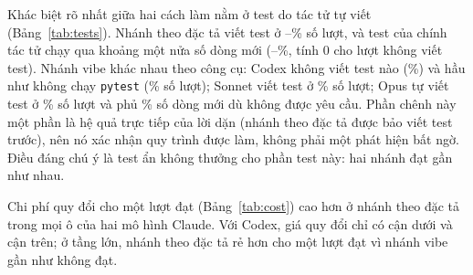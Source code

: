 \begin{table}[H]
\centering\scriptsize\setlength{\tabcolsep}{3pt}
\caption{Chi phí và chất lượng: mỗi ô là trung bình của nhánh theo đặc tả / nhánh vibe. Token gồm cả
token đọc cache. Lỗi tĩnh là số lỗi ruff và pyrefly trên các file bị đổi. Hồi quy là tỉ lệ lượt làm hỏng
ít nhất một test cũ. $\Delta$MI là thay đổi chỉ số bảo trì so với commit cha; H3c đọc ``không kém hơn'' với
biên 5 điểm.}
\label{tab:secondary}

\end{table}

Khác biệt rõ nhất giữa hai cách làm nằm ở test do tác tử tự viết (Bảng~\ref{tab:tests}). Nhánh theo đặc tả
viết test ở \NumResSonnetSpecTestsAnyPct{}--\NumResCodexSpecTestsAnyPct{}\% số lượt, và test của chính tác
tử chạy qua khoảng một nửa số dòng mới (\NumResSonnetSpecCovPct{}--\NumResOpusSpecCovPct{}\%, tính 0 cho
lượt không viết test). Nhánh vibe khác nhau theo công cụ: Codex không viết test nào
(\NumResCodexVibeTestsAnyPct{}\%) và hầu như không chạy \texttt{pytest} (\NumResCodexVibePytestPct{}\% số
lượt); Sonnet viết test ở \NumResSonnetVibeTestsAnyPct{}\% số lượt; Opus tự viết test ở
\NumResOpusVibeTestsAnyPct{}\% số lượt và phủ \NumResOpusVibeCovPct{}\% số dòng mới dù không được yêu cầu.
Phần chênh này một phần là hệ quả trực tiếp của lời dặn (nhánh theo đặc tả được bảo viết test trước), nên
nó xác nhận quy trình được làm, không phải một phát hiện bất ngờ. Điều đáng chú ý là test ẩn không thưởng
cho phần test này: hai nhánh đạt gần như nhau.

\begin{table}[H]
\centering\footnotesize\setlength{\tabcolsep}{4pt}
\caption{Test do tác tử viết, theo nhóm và cách làm (mọi tầng). Độ phủ là tỉ lệ dòng mới ở
\texttt{backend/src} được test của chính tác tử chạy qua, tính 0 khi lượt không viết test.}
\label{tab:tests}

\end{table}

Chi phí quy đổi cho một lượt đạt (Bảng~\ref{tab:cost}) cao hơn ở nhánh theo đặc tả
trong mọi ô của hai mô hình Claude. Với Codex, giá quy đổi chỉ có cận dưới và cận trên; ở tầng lớn, nhánh
theo đặc tả rẻ hơn cho một lượt đạt vì nhánh vibe gần như không đạt.

\begin{table}[H]
\centering\small
\caption{Chi phí quy đổi theo giá API cho một lượt đạt (USD). Với \texttt{codex-luna} là khoảng từ cận
dưới tới cận trên của giá.}
\label{tab:cost}

\end{table}


